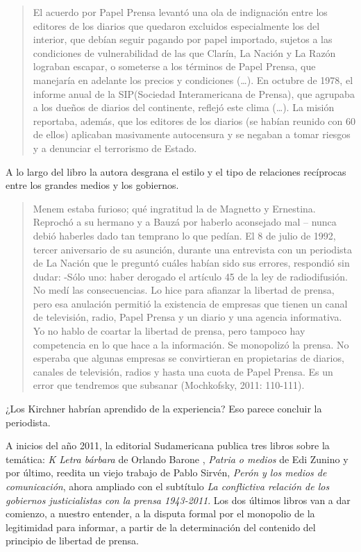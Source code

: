 \begin{quote}
El acuerdo por Papel Prensa levantó una ola de indignación entre los editores de los diarios que quedaron excluidos especialmente los del interior, que debían seguir pagando por papel importado, sujetos a las condiciones de vulnerabilidad de las que Clarín, La Nación y La Razón lograban escapar, o someterse a los términos de Papel Prensa, que manejaría en adelante los precios y condiciones (\ldots). En octubre de 1978, el informe anual de la SIP(Sociedad Interamericana de Prensa), que agrupaba a los dueños de diarios del continente, reflejó este clima (\ldots). La misión reportaba, además, que los editores de los diarios (se habían reunido con 60 de ellos) aplicaban masivamente autocensura y se negaban a tomar riesgos y a denunciar el terrorismo de Estado.
\end{quote}

A lo largo del libro la autora desgrana el estilo y el tipo de relaciones recíprocas entre los grandes medios y los gobiernos.

\begin{quote}
Menem estaba furioso; qué ingratitud la de Magnetto y Ernestina. Reprochó a su hermano y a Bauzá por haberlo aconsejado mal -- nunca debió haberles dado tan temprano lo que pedían. El 8 de julio de 1992, tercer aniversario de su asunción, durante una entrevista con un periodista de La Nación que le preguntó cuáles habían sido sus errores, respondió sin dudar: -Sólo uno: haber derogado el artículo 45 de la ley de radiodifusión. No medí las consecuencias. Lo hice para afianzar la libertad de prensa, pero esa anulación permitió la existencia de empresas que tienen un canal de televisión, radio, Papel Prensa y un diario y una agencia informativa. Yo no hablo de coartar la libertad de prensa, pero tampoco hay competencia en lo que hace a la información. Se monopolizó la prensa. No esperaba que algunas empresas se convirtieran en propietarias de diarios, canales de televisión, radios y hasta una cuota de Papel Prensa. Es un error que tendremos que subsanar (Mochkofsky, 2011: 110-111).
\end{quote}

¿Los Kirchner habrían aprendido de la experiencia? Eso parece concluir la periodista.

A inicios del año 2011, la editorial Sudamericana publica tres libros sobre la temática: \emph{K Letra bárbara} de Orlando Barone , \emph{Patria o medios} de Edi Zunino y por último, reedita un viejo trabajo de Pablo Sirvén, \emph{Perón y los medios de comunicación}, ahora ampliado con el subtítulo \emph{La conflictiva relación de los gobiernos justicialistas con la prensa 1943-2011}. Los dos últimos libros van a dar comienzo, a nuestro entender, a la disputa formal por el monopolio de la legitimidad para informar, a partir de la determinación del contenido del principio de libertad de prensa.

